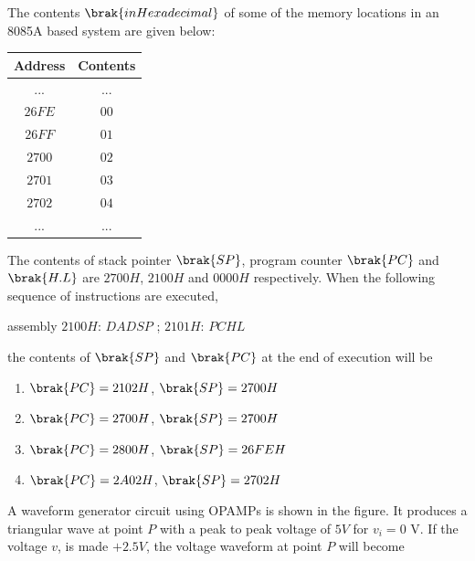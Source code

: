     \item The contents $\brak{in Hexadecimal}$ of some of the memory locations in an 8085A based system are given below:

    \begin{tabular}{|c|c|}
        \hline
        Address & Contents \\
        \hline
        ... & ... \\
        $26FE$ & $00$ \\
        $26FF$ & $01$ \\
        $2700$ & $02$ \\
        $2701$ & $03$ \\
        $2702$ & $04$ \\
        ... & ... \\
        \hline
    \end{tabular}

    The contents of stack pointer $\brak{SP}$, program counter $\brak{PC}$ and $\brak{H.L}$ are $2700H$, $2100H$ and $0000H$ respectively. When the following sequence of instructions  
 are executed,

    assembly
    $2100 H$:  $DAD SP$ ;
    $2101 H$:  $PCHL$
    

    the contents of $\brak{SP}$ and $\brak{PC}$ at the end of execution will be
        \begin{enumerate}
            \item $\brak{PC} = 2102H$, $\brak{SP} = 2700H$
            \item $\brak{PC} = 2700H$, $\brak{SP} = 2700H$
            \item $\brak{PC} = 2800H$, $\brak{SP} = 26FEH$
            \item $\brak{PC} = 2A02H$, $\brak{SP} = 2702H$
        \end{enumerate}

     \item A waveform generator circuit using OPAMPs is shown in the figure. It produces a triangular wave at point $P$ with a peak to peak voltage  
        of $5 V$ for $v_i = 0$ V. If the voltage $v$, is made $+2.5V$, the voltage waveform at point $P$ will become


